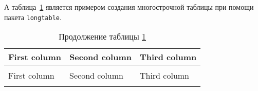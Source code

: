 А таблица~\ref{table:longtable} является примером создания многострочной таблицы
при помощи пакета \lstinline:longtable:.
	
\begin{longtable}{|p{3cm}|p{7cm}|p{5cm}|}
    \caption{Пример создания таблицы при помощи пакета longtable} 
    \label{table:longtable} \\
    \hline 
    First column & Second column & Third column \\\hline 
    \endfirsthead
    \caption*{Продолжение таблицы \ref{table:longtable}} \\
    \hline
    First column & Second column & Third column \\\hline
    \endhead

    \hline
    \endfoot
    \hline
    \endlastfoot 


\end{longtable}
